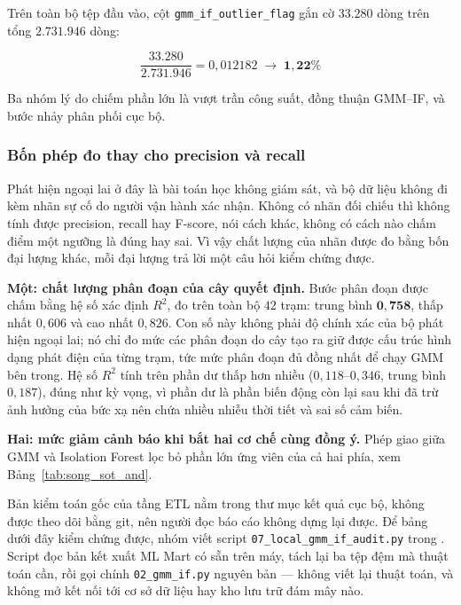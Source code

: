 \documentclass[12pt, a4paper]{report}
\begin{document}
Trên toàn bộ tệp đầu vào, cột \texttt{gmm\_if\_outlier\_flag} gắn cờ $\mathbf{33.280}$ dòng trên
tổng $\mathbf{2.731.946}$ dòng:

\begin{equation}
\frac{33.280}{2.731.946} = 0{,}012182 \;\longrightarrow\; \mathbf{1{,}22\%}
\end{equation}

Ba nhóm lý do chiếm phần lớn là vượt trần công suất, đồng thuận GMM--IF, và bước nhảy phân
phối cục bộ.

\subsubsection{Bốn phép đo thay cho precision và recall}

Phát hiện ngoại lai ở đây là bài toán học không giám sát, và bộ dữ liệu không đi
kèm nhãn sự cố do người vận hành xác nhận. Không có nhãn đối chiếu thì không tính được
precision, recall hay F-score, nói cách khác, không có cách nào chấm điểm một ngưỡng là
đúng hay sai. Vì vậy chất lượng của nhãn được đo bằng bốn đại lượng khác, mỗi đại lượng trả
lời một câu hỏi kiểm chứng được.

\textbf{Một: chất lượng phân đoạn của cây quyết định.} Bước phân đoạn được chấm bằng hệ
số xác định $R^2$, đo trên toàn bộ $42$ trạm: trung bình $\mathbf{0{,}758}$, thấp nhất
$0{,}606$ và cao nhất $0{,}826$. Con số này không phải độ chính xác của bộ phát
hiện ngoại lai; nó chỉ đo mức các phân đoạn do cây tạo ra giữ được cấu trúc hình dạng phát
điện của từng trạm, tức mức phân đoạn đủ đồng nhất để chạy GMM bên trong. Hệ số $R^2$ tính
trên phần dư thấp hơn nhiều ($0{,}118$--$0{,}346$, trung bình $0{,}187$), đúng như kỳ vọng,
vì phần dư là phần biến động còn lại sau khi đã trừ ảnh hưởng của bức xạ nên chứa nhiều
nhiễu thời tiết và sai số cảm biến.

\textbf{Hai: mức giảm cảnh báo khi bắt hai cơ chế cùng đồng ý.} Phép giao giữa GMM và
Isolation Forest lọc bỏ phần lớn ứng viên của cả hai phía, xem Bảng~\ref{tab:song_sot_and}.

Bản kiểm toán gốc của tầng ETL nằm trong thư mục kết quả cục bộ, không được theo dõi bằng
git, nên người đọc báo cáo không dựng lại được. Để bảng dưới đây kiểm chứng được, nhóm viết
script \texttt{07\_local\_gmm\_if\_audit.py} trong .
Script đọc bản kết xuất ML Mart có sẵn trên máy, tách lại ba tệp đệm mà thuật toán cần, rồi
gọi chính \texttt{02\_gmm\_if.py} nguyên bản --- không viết lại thuật toán, và không mở kết nối
tới cơ sở dữ liệu hay kho lưu trữ đám mây nào.
\end{document}
